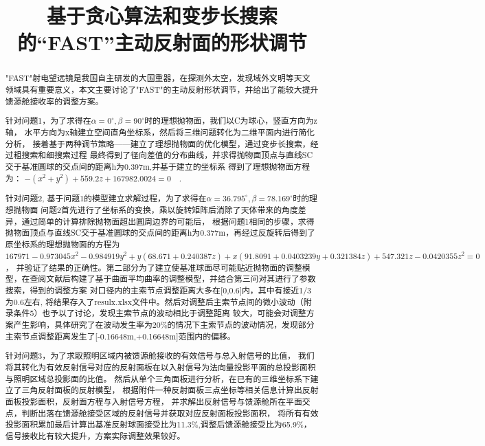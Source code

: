 \documentclass[withoutpreface,bwprint]{cumcmthesis} %
\title{基于贪心算法和变步长搜索的“FAST”主动反射面的形状调节}
\begin{document}
        \maketitle
        \begin{abstract}
          
"FAST"射电望远镜是我国自主研发的大国重器，在探测外太空，发现域外文明等天文
领域具有重要意义，本文主要讨论了"FAST"的主动反射形状调节，并给出了能较大提升馈源舱接收率的调整方案。 


 针对问题1，为了求得在$\alpha=0^\circ,\beta = 90^\circ $时的理想抛物面，我们以C为球心，竖直方向为z轴，
 水平方向为x轴建立空间直角坐标系，然后将三维问题转化为二维平面内进行简化分析，
 接着基于两种调节策略——建立了理想抛物面的优化模型，通过变步长搜索，经过粗搜索和细搜索过程
 最终得到了径向差值的分布曲线，并求得抛物面顶点与直线SC交于基准圆球的交点间的距离h为0.397m,并基于建立的坐标系
 得到了理想抛物面方程为：
 $-(x^2+y^2)+559.2z+167982.0024 =0\quad$.
 

 针对问题2, 基于问题1的模型建立求解过程，为了求得在$\alpha = 36.795^\circ , \beta = 78.169^\circ$时的理想抛物面
 问题2首先进行了坐标系的变换，乘以旋转矩阵后消除了天体带来的角度差异，通过简单的计算排除抛物面超出圆周边界的可能后，
 根据问题1相同的步骤，求得抛物面顶点与直线SC交于基准圆球的交点间的距离h为0.377m，再经过反旋转后得到了原坐标系的理想抛物面的方程为
 $167971 - 0.973045 x^2 - 0.984919 y^2 + y (68.671 + 0.240387 z)+ x (91.8091 + 0.0403239 y + 0.321384 z)+ 547.321 z - 0.0420355 z^2 = 0$，
 并验证了结果的正确性。第二部分为了建立使基准球面尽可能贴近抛物面的调整模型，在查阅文献后构建了基于曲面平均曲率的调整模型，并结合第三问对其进行了参数搜索，得到的调整方案
对口径内的主索节点调整距离大多在[0,0.6]内，其中有接近1/3为0.6左右, 将结果存入了resulx.xlsx文件中。然后对调整后主索节点间的微小波动（附录条件5）也予以了讨论，发现主索节点的波动相比于调整距离
较大，可能会对调整方案产生影响，具体研究了在波动发生率为20\%的情况下主索节点的波动情况，发现部分主索节点调整距离发生了[-0.16648m,+0.16648m]范围内的偏移。





 针对问题3，为了求取照明区域内被馈源舱接收的有效信号与总入射信号的比值，
 我们将其转化为有效反射信号对应的反射面板在以入射信号为法向量投影平面的总投影面积与照明区域总投影面的比值。
 然后从单个三角面板进行分析，在已有的三维坐标系下建立了三角反射面板的反射模型，
 根据附件一种反射面板三点坐标等相关信息计算出反射面板投影面积，反射面方程与入射信号方程，
 并求解出反射信号与馈源舱所在平面交点，判断出落在馈源舱接受区域的反射信号并获取对应反射面板投影面积，
 将所有有效投影面积累加最后计算出基准反射球面接受比为11.3\%,调整后馈源舱接受比为65.9\%，
 信号接收比有较大提升，方案实际调整效果较好。





        \end{abstract}
\end{document}
